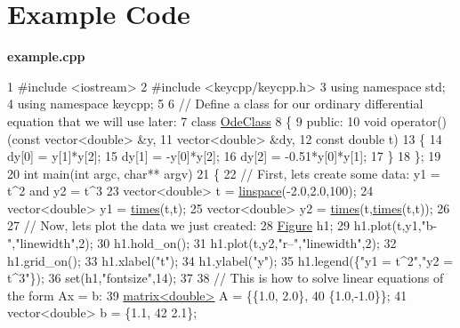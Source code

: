 \section*{Example Code}

{\bfseries {\ttfamily example.\-cpp}} 
\begin{DoxyCodeInclude}
1 \textcolor{preprocessor}{#include <iostream>}
2 \textcolor{preprocessor}{#include <keycpp/keycpp.h>}
3 \textcolor{keyword}{using namespace }std;
4 \textcolor{keyword}{using namespace }keycpp;
5 
6 \textcolor{comment}{// Define a class for our ordinary differential equation that we will use later:}
7 \textcolor{keyword}{class }\hyperlink{class_ode_class}{OdeClass}
8 \{
9     \textcolor{keyword}{public}:
10         \textcolor{keywordtype}{void} operator()(\textcolor{keyword}{const} vector<double> &y,
11                         vector<double> &dy,
12                         \textcolor{keyword}{const} \textcolor{keywordtype}{double} t)
13         \{
14             dy[0] = y[1]*y[2];
15             dy[1] = -y[0]*y[2];
16             dy[2] = -0.51*y[0]*y[1];
17         \}
18 \};
19 
20 \textcolor{keywordtype}{int} main(\textcolor{keywordtype}{int} argc, \textcolor{keywordtype}{char}** argv)
21 \{
22     \textcolor{comment}{// First, lets create some data: y1 = t^2 and y2 = t^3}
23     vector<double> t = \hyperlink{namespacekeycpp_ab57eee495c93eb18ebf8c8ccf4d44e74}{linspace}(-2.0,2.0,100);
24     vector<double> y1 = \hyperlink{namespacekeycpp_ac1ff99e34619478096c271b38df1f3d7}{times}(t,t);
25     vector<double> y2 = \hyperlink{namespacekeycpp_ac1ff99e34619478096c271b38df1f3d7}{times}(t,\hyperlink{namespacekeycpp_ac1ff99e34619478096c271b38df1f3d7}{times}(t,t));
26 
27     \textcolor{comment}{// Now, lets plot the data we just created:}
28     \hyperlink{classkeycpp_1_1_figure}{Figure} h1;
29     h1.plot(t,y1,\textcolor{stringliteral}{"b-"},\textcolor{stringliteral}{"linewidth"},2);
30     h1.hold\_on();
31     h1.plot(t,y2,\textcolor{stringliteral}{"r--"},\textcolor{stringliteral}{"linewidth"},2);
32     h1.grid\_on();
33     h1.xlabel(\textcolor{stringliteral}{"t"});
34     h1.ylabel(\textcolor{stringliteral}{"y"});
35     h1.legend(\{\textcolor{stringliteral}{"y1 = t^2"},\textcolor{stringliteral}{"y2 = t^3"}\});
36     \textcolor{keyword}{set}(h1,\textcolor{stringliteral}{"fontsize"},14);
37 
38     \textcolor{comment}{// This is how to solve linear equations of the form Ax = b:}
39     \hyperlink{classkeycpp_1_1matrix}{matrix<double>} A = \{\{1.0, 2.0\},
40                         \{1.0,-1.0\}\};
41     vector<double> b = \{1.1,
42                         2.1\};

\end{DoxyCodeInclude}
